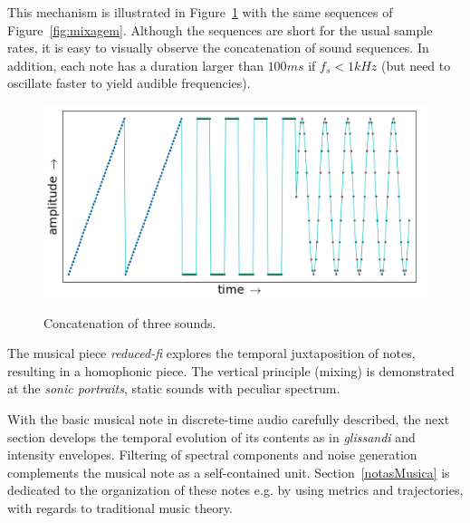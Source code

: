 This mechanism is illustrated in Figure~\ref{fig:concatenacao} with the same sequences of Figure~\ref{fig:mixagem}. Although the sequences are short for the usual sample rates, it is easy to visually observe the concatenation of sound sequences. In addition, each note has  a duration larger than $100ms$ if $f_s<1kHz$ (but need to oscillate faster to yield audible frequencies).

\begin{figure}[h!]
{    \centering
        \includegraphics[width=.5\columnwidth]{figures/concatenacao__}}
    \caption{Concatenation of three sounds.}
        \label{fig:concatenacao}
\end{figure}

The musical piece \emph{reduced-fi} explores the temporal juxtaposition of notes, resulting in a homophonic piece.
The vertical principle (mixing) is demonstrated at the \emph{sonic portraits}, static sounds with peculiar spectrum.~\cite{MASSA}

With the basic musical note in discrete-time audio carefully described, the next section develops the temporal evolution of its contents as in \emph{glissandi} and intensity envelopes. Filtering of spectral components and noise generation complements the musical note as a self-contained unit. Section~\ref{notasMusica} is dedicated to the organization of these notes e.g. by using metrics and trajectories, with regards to traditional music theory.


